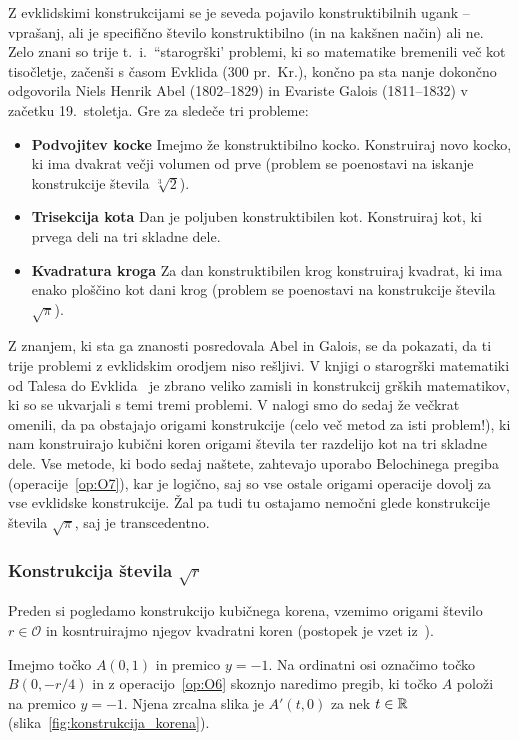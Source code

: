 Z evklidskimi konstrukcijami se je seveda pojavilo konstruktibilnih ugank -- vprašanj, ali je specifično število konstruktibilno (in na kakšnen način) ali ne. Zelo znani so trije t.\ i.\ ``starogrški' problemi, ki so matematike bremenili več kot tisočletje, začenši s časom Evklida (300 pr.\ Kr.), končno pa sta nanje dokončno odgovorila Niels Henrik Abel (1802--1829) in Evariste Galois (1811--1832) v začetku 19.\ stoletja. Gre za sledeče tri probleme:
\begin{itemize}
    \item \textbf{Podvojitev kocke} Imejmo že konstruktibilno kocko. Konstruiraj novo kocko, ki ima dvakrat večji volumen od prve (problem se poenostavi na iskanje konstrukcije števila $\sqrt[3]{2}$).
    \item \textbf{Trisekcija kota} Dan je poljuben konstruktibilen kot. Konstruiraj kot, ki prvega deli na tri skladne dele.
    \item \textbf{Kvadratura kroga} Za dan konstruktibilen krog konstruiraj kvadrat, ki ima enako ploščino kot dani krog (problem se poenostavi na konstrukcije števila $\sqrt{\pi}$).
\end{itemize}

Z znanjem, ki sta ga znanosti posredovala Abel in Galois, se da pokazati, da ti trije problemi z evklidskim orodjem niso rešljivi. V knjigi o starogrški matematiki od Talesa do Evklida~\cite[str.\ 218--270]{heath1921} je zbrano veliko zamisli in konstrukcij grških matematikov, ki so se ukvarjali s temi tremi problemi. V nalogi smo do sedaj že večkrat omenili, da pa obstajajo origami konstrukcije (celo več metod za isti problem!), ki nam konstruirajo kubični koren origami števila ter razdelijo kot na tri skladne dele. Vse metode, ki bodo sedaj naštete, zahtevajo uporabo Belochinega pregiba (operacije~\ref{op:O7}), kar je logično, saj so vse ostale origami operacije dovolj za vse evklidske konstrukcije. Žal pa tudi tu ostajamo nemočni glede konstrukcije števila $\sqrt{\pi}$, saj je transcedentno.

\subsubsection*{Konstrukcija števila $\sqrt{r}$}

Preden si pogledamo konstrukcijo kubičnega korena, vzemimo origami število $r \in \mathcal{O}$ in kosntruirajmo njegov kvadratni koren (postopek je vzet iz~\cite[str.\ 58]{hull2013}).

Imejmo točko $A (0, 1) $ in premico $y = -1$. Na ordinatni osi označimo točko $B (0, -r/4)$ in z operacijo~\ref{op:O6} skoznjo naredimo pregib, ki točko $A$ položi na premico $y = -1$. Njena zrcalna slika je $A' (t, 0) $ za nek $t \in \mathbb R$ (slika~\ref{fig:konstrukcija_korena}).

